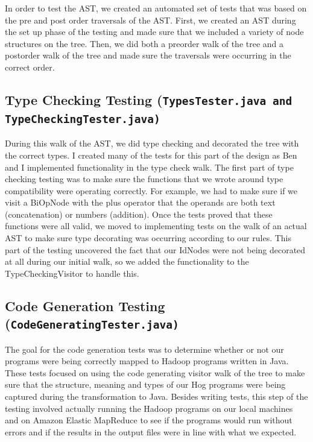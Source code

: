 \documentclass{book}
\begin{document}
In order to test the AST, we created an automated set of tests that was based on the pre and post order traversals of the AST. First, we created an AST during the set up phase of the testing and made sure that we included a variety of node structures on the tree. Then, we did both a preorder walk of the tree and a postorder walk of the tree and made sure the traversals were occurring in the correct order.  

\subsection*{Type Checking Testing (\tt TypesTester.java\rm \,and \tt  TypeCheckingTester.java\rm)}

During this walk of the AST, we did type checking and decorated the tree with the correct types. I created many of the tests for this part of the design as Ben and I implemented functionality in the type check walk. The first part of type checking testing was to make sure the functions that we wrote around type compatibility were operating correctly. For example, we had to make sure if we visit a BiOpNode with the plus operator that the operands are both text (concatenation) or numbers (addition). Once the tests proved that these functions were all valid, we moved to implementing tests on the walk of an actual AST to make sure type decorating was occurring according to our rules. This part of the testing uncovered the fact that our IdNodes were not being decorated at all during our initial walk, so we added the functionality to the TypeCheckingVisitor to handle this.  

\subsection*{Code Generation Testing (\tt CodeGeneratingTester.java\rm)}

The goal for the code generation tests was to determine whether or not our programs were being correctly mapped to Hadoop programs written in Java. These tests focused on using the code generating visitor walk of the tree to make sure that the structure, meaning and types of our Hog programs were being captured during the transformation to Java. Besides writing tests, this step of the testing involved actually running the Hadoop programs on our local machines and on Amazon Elastic MapReduce to see if the programs would run without errors and if the results in the output files were in line with what we expected.
\end{document}
